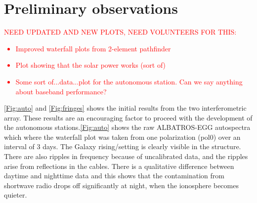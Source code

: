 \documentclass{ws-jai}
\newcommand{\attention}[1]{\textcolor{red}{\bf {#1}}}
\begin{document}

\section{Preliminary observations}

\attention{NEED UPDATED AND NEW PLOTS, NEED VOLUNTEERS FOR THIS:
  \begin{itemize}
    \item{Improved waterfall plots from 2-element pathfinder}
    \item{Plot showing that the solar power works (sort of)}
    \item{Some sort of...data...plot for the autonomous station.  Can
      we say anything about baseband performance?}
  \end{itemize}
}
 
\autoref{Fig:auto} and \autoref{Fig:fringes} shows the initial results from the two interferometric array. These results are an encouraging factor to proceed with the development of the autonomous stations.\autoref{Fig:auto} shows the raw ALBATROS-EGG autospectra which where the waterfall plot was taken from one polarization (pol0) over an interval of 3 days. The Galaxy rising/setting is clearly visible in the structure. There are also ripples in frequency because of uncalibrated data, and the ripples arise from reflections in the cables. There is a qualitative difference between daytime and nighttime data and this shows that the contamination from shortwave radio drops off significantly at night, when the ionosphere becomes quieter.
\end{document}
